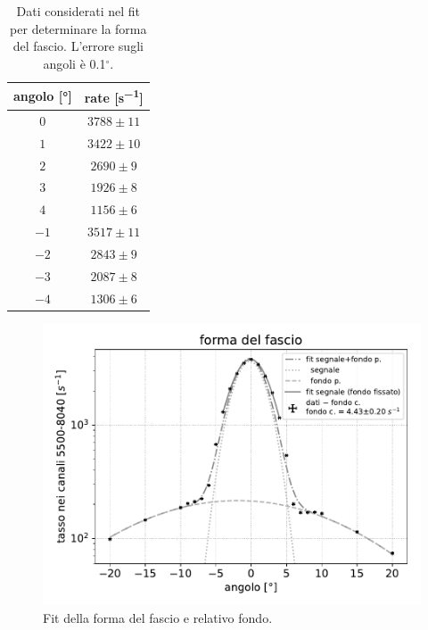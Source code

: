 \begin{table}[h]
\centering

\begin{tabular}{|c|c|}
\hline
angolo [\si{\degree}] & rate [\si{s^{-1}}] \\
\hline
$ 0 $ & $ 3788\pm11 $ \\ 

$ 1 $ & $ 3422\pm10 $ \\ 
$ 2 $ & $ 2690 \pm 9 $ \\ 
$ 3 $ & $ 1926 \pm 8 $ \\ 
$ 4 $ & $ 1156 \pm 6 $ \\ 

$ -1 $ & $ 3517\pm11 $ \\ 
$ -2 $ & $ 2843 \pm 9 $ \\ 
$ -3 $ & $ 2087 \pm 8 $ \\ 
$ -4 $ & $ 1306 \pm 6 $ \\ 
\hline
\end{tabular}

\caption{Dati considerati nel fit per determinare la forma del fascio. L'errore sugli angoli è 0.1$^{\circ}$.}
\label{tabfo}
\end{table}

\begin{figure}[h]
\centering
\includegraphics[width=25 em]{forma}
\caption{Fit della forma del fascio e relativo fondo.}
\label{forma}
\end{figure}



